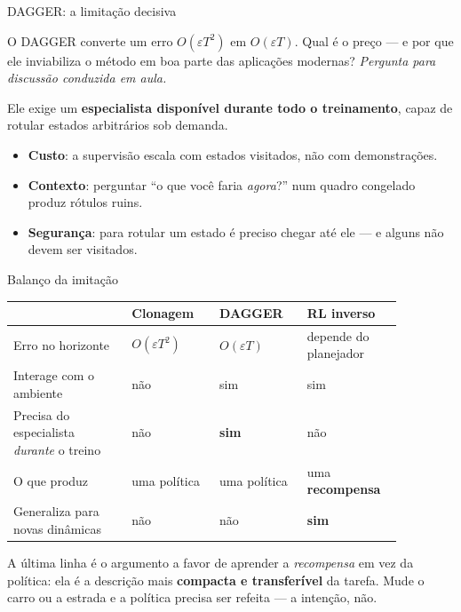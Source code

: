 \documentclass[aspectratio=169, 11pt]{beamer}
\newcommand{\paradiscussao}{\smallskip
  {\footnotesize\color{rlCinza}\itshape Pergunta para discussão conduzida em aula.}}
\begin{document}
\begin{frame}{DAGGER: a limitação decisiva}

  \begin{quizbox}{}
    O DAGGER converte um erro $O(\varepsilon T^2)$ em $O(\varepsilon T)$. Qual é
    o preço --- e por que ele inviabiliza o método em boa parte das aplicações
    modernas?
    \paradiscussao
  \end{quizbox}

  \pause

  \begin{respbox}
    Ele exige um \textbf{especialista disponível durante todo o treinamento},
    capaz de rotular estados arbitrários sob demanda.
    \begin{itemize}\setlength{\itemsep}{0.1ex}
      \item \textbf{Custo}: a supervisão escala com estados visitados, não com
        demonstrações.
      \item \textbf{Contexto}: perguntar ``o que você faria \emph{agora}?'' num
        quadro congelado produz rótulos ruins.
      \item \textbf{Segurança}: para rotular um estado é preciso chegar até ele
        --- e alguns não devem ser visitados.
    \end{itemize}
  \end{respbox}
\end{frame}

\begin{frame}{Balanço da imitação}

  \begin{center}\footnotesize
  \begin{tabular}{@{}p{0.27\linewidth}p{0.2\linewidth}p{0.2\linewidth}p{0.2\linewidth}@{}}
    \toprule
    & \textbf{Clonagem} & \textbf{DAGGER} & \textbf{RL inverso} \\
    \midrule
    Erro no horizonte & $O(\varepsilon T^2)$ & $O(\varepsilon T)$ &
      depende do planejador \\
    Interage com o ambiente & não & sim & sim \\
    Precisa do especialista \emph{durante} o treino & não & \textbf{sim} & não \\
    O que produz & uma política & uma política & uma \textbf{recompensa} \\
    Generaliza para novas dinâmicas & não & não & \textbf{sim} \\
    \bottomrule
  \end{tabular}
  \end{center}

  \begin{ideiabox}
    A última linha é o argumento a favor de aprender a \emph{recompensa} em vez
    da política: ela é a descrição mais \textbf{compacta e transferível} da
    tarefa. Mude o carro ou a estrada e a política precisa ser refeita --- a
    intenção, não.
  \end{ideiabox}
\end{frame}
\end{document}
